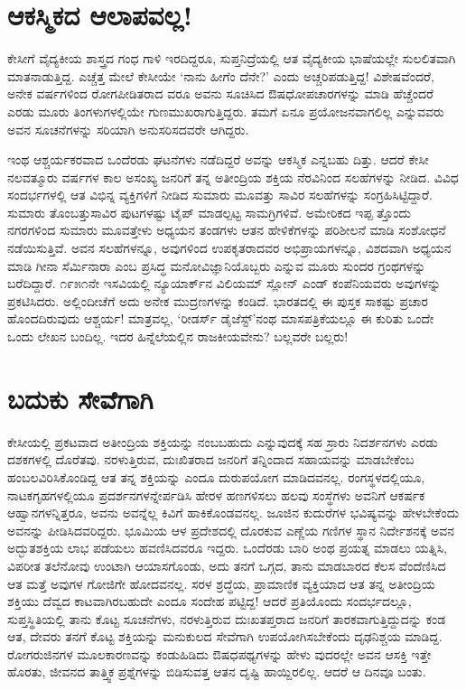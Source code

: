 \section{ಆಕಸ್ಮಿಕದ ಆಲಾಪವಲ್ಲ!}

ಕೇಸೀಗೆ ವೈದ್ಯಕೀಯ ಶಾಸ್ತ್ರದ ಗಂಧ ಗಾಳಿ ಇರದಿದ್ದರೂ, ಸುಪ್ತನಿದ್ರೆಯಲ್ಲಿ ಆತ ವೈದ್ಯಕೀಯ ಭಾಷೆಯಲ್ಲೇ ಸುಲಲಿತವಾಗಿ ಮಾತನಾಡುತ್ತಿದ್ದ. ಎಚ್ಚೆತ್ತ ಮೇಲೆ ಕೇಸೀಯೇ ‘ನಾನು ಹೀಗೆಂ ದೆನೇ?’ ಎಂದು ಅಚ್ಚರಿಪಡುತ್ತಿದ್ದ! ವಿಶೇಷವೆಂದರೆ, ಅನೇಕ ವರ್ಷಗಳಿಂದ ರೋಗಪೀಡಿತರಾದ ವರೂ ಅವನು ಸೂಚಿಸಿದ ಔಷಧೋಪಚಾರಗಳನ್ನು ಮಾಡಿ ಹೆಚ್ಚೆಂದರೆ ಎರಡು ಮೂರು ತಿಂಗಳುಗಳಲ್ಲಿಯೇ ಗುಣಮುಖರಾಗುತ್ತಿದ್ದರು. ತಮಗೆ ಏನೂ ಪ್ರಯೋಜನವಾಗಲಿಲ್ಲ ಎನ್ನುವವರು ಅವನ ಸೂಚನೆಗಳನ್ನು ಸರಿಯಾಗಿ ಅನುಸರಿಸದವರೇ ಆಗಿದ್ದರು.

ಇಂಥ ಆಶ್ಚರ್ಯಕರವಾದ ಒಂದೆರಡು ಘಟನೆಗಳು ನಡೆದಿದ್ದರೆ ಅವನ್ನು ಆಕಸ್ಮಿಕ ಎನ್ನಬಹು ದಿತ್ತು. ಆದರೆ ಕೇಸೀ ನಲವತ್ಮೂರು ವರ್ಷಗಳ ಕಾಲ ಅಸಂಖ್ಯ ಜನರಿಗೆ ತನ್ನ ಅತೀಂದ್ರಿಯ ಶಕ್ತಿಯ ನೆರವಿನಿಂದ ಸಲಹೆಗಳನ್ನು ನೀಡಿದ. ವಿವಿಧ ಸಂದರ್ಭಗಳಲ್ಲಿ ಆತ ವಿಭಿನ್ನ ವ್ಯಕ್ತಿಗಳಿಗೆ ನೀಡಿದ ಸುಮಾರು ಮೂವತ್ತು ಸಾವಿರ ಸಲಹೆಗಳನ್ನು ಸಂಗ್ರಹಿಸಿಟ್ಟಿದ್ದಾರೆ. ಸುಮಾರು ತೊಂಬತ್ತುಸಾವಿರ ಪುಟಗಳಷ್ಟು ಟೈಪ್ ಮಾಡಲ್ಪಟ್ಟ ಸಾಮಗ್ರಿಗಳಿವೆ. ಅಮೇರಿಕದ ಇಪ್ಪ ತ್ತೊಂದು ನಗರಗಳಿಂದ ಸುಮಾರು ಮೂವತ್ತೇಳು ಅಧ್ಯಯನ ತಂಡಗಳು ಆತನ ಹೇಳಿಕೆಗಳನ್ನು ಪರಿಶೀಲನೆ ಮಾಡಿ ಸಂಶೋಧನೆ ನಡೆಯಿಸುತ್ತಿವೆ. ಅವನ ಸಲಹೆಗಳನ್ನೂ, ಅವುಗಳಿಂದ ಉಪಕೃತರಾದವರ ಅಭಿಪ್ರಾಯಗಳನ್ನೂ, ವಿಶದವಾಗಿ ಅಧ್ಯಯನ ಮಾಡಿ ಗೀನಾ ಸೆರ್ಮಿನಾರಾ ಎಂಬ ಪ್ರಸಿದ್ಧ ಮನೋವಿಜ್ಞಾನಿಯೊಬ್ಬರು  ಎನ್ನುವ ಮೂರು ಸುಂದರ ಗ್ರಂಥಗಳನ್ನು ಬರೆದಿದ್ದಾರೆ. ೧೯೫೧ನೇ ಇಸವಿಯಲ್ಲಿ ನ್ಯೂಯಾರ್ಕ್​ನ ವಿಲಿಯಮ್ ಸ್ಲೋನ್ ಎಂಡ್ ಕಂಪೆನಿಯವರು ಅವುಗಳನ್ನು ಪ್ರಕಟಿಸಿದರು. ಅಲ್ಲಿಂದೀಚೆಗೆ ಅದು ಅನೇಕ ಮುದ್ರಣಗಳನ್ನು ಕಂಡಿದೆ. ಭಾರತದಲ್ಲಿ ಈ ಪುಸ್ತಕ ಸಾಕಷ್ಟು ಪ್ರಚಾರ ಹೊಂದದಿರುವುದು ಆಶ್ಚರ್ಯ! ಮಾತ್ರವಲ್ಲ, ‘ರೀಡರ್ಸ್ ಡೈಜೆಸ್ಟ್​’ನಂಥ ಮಾಸಪತ್ರಿಕೆಯಲ್ಲೂ ಈ ಕುರಿತು ಒಂದೇ ಒಂದು ಲೇಖನ ಬಂದಿಲ್ಲ. ಇದರ ಹಿನ್ನೆಲೆಯಲ್ಲಿನ ರಾಜಕೀಯವೇನು? ಬಲ್ಲವರೇ ಬಲ್ಲರು!


\section{ಬದುಕು ಸೇವೆಗಾಗಿ}

ಕೇಸೀಯಲ್ಲಿ ಪ್ರಕಟವಾದ ಅತೀಂದ್ರಿಯ ಶಕ್ತಿಯನ್ನು ನಂಬಬಹುದು ಎನ್ನುವುದಕ್ಕೆ ಸಹ ಸ್ರಾರು ನಿದರ್ಶನಗಳು ಎರಡು ದಶಕಗಳಲ್ಲಿ ದೊರೆತವು. ನರಳುತ್ತಿರುವ, ದುಃಖಿತರಾದ ಜನರಿಗೆ ತನ್ನಿಂದಾದ ಸಹಾಯವನ್ನು ಮಾಡಬೇಕೆಂಬ ಹಂಬಲವಿರಿಸಿಕೊಂಡಿದ್ದ ಆತ ತನ್ನ ಶಕ್ತಿಯನ್ನು ಎಂದೂ ದುರುಪಯೋಗ ಮಾಡಿದವನಲ್ಲ. ರಂಗಸ್ಥಳದಲ್ಲಿಯೂ, ನಾಟಕಗೃಹಗಳಲ್ಲಿಯೂ ಪ್ರದರ್ಶನಗಳನ್ನೇರ್ಪಡಿಸಿ ಹೇರಳ ಹಣಗಳಿಸಲು ಹಲವು ಸಂಸ್ಥೆಗಳು ಅವನಿಗೆ ಆಕರ್ಷಕ ಆಹ್ವಾನಗಳನ್ನಿತ್ತರೂ, ಅವನು ಅವನ್ನೆಲ್ಲ ಕಿವಿಗೆ ಹಾಕಿಕೊಂಡವನಲ್ಲ. ಜೂಜಿನ ಕುದುರೆಗಳ ಭವಿಷ್ಯವನ್ನು ಹೇಳಬೇಕೆಂದು ಅವನನ್ನು ಪೀಡಿಸಿದವರಿದ್ದರು. ಭೂಮಿಯ ಆಳ ಪ್ರದೇಶದಲ್ಲಿ ದೊರಕುವ ಎಣ್ಣೆಯ ಗಣಿಗಳ ಸ್ಥಾನ ನಿರ್ದೇಶನಕ್ಕೆ ಅವನ ಅದ್ಭುತಶಕ್ತಿಯ ಲಾಭ ಪಡೆಯಲು ಹವಣಿಸಿದವರೂ ಇದ್ದರು. ಒಂದೆರಡು ಬಾರಿ ಅಂಥ ಪ್ರಯತ್ನ ಮಾಡಲು ಯತ್ನಿಸಿ, ವಿಪರೀತ ತಲೆನೋವು ಉಂಟಾಗಿ ಆಯಾಸಗೊಂಡು, ಅದು ತನಗೆ ಒಗ್ಗದ, ತಾನು ಮಾಡಬಾರದ ಕೆಲಸ ವೆಂದೆಣಿಸಿದ ಆತ ಮತ್ತೆ ಅವುಗಳ ಗೋಜಿಗೇ ಹೋದವನಲ್ಲ. ಸರಳ ಶ್ರದ್ಧೆಯ, ಪ್ರಾಮಾಣಿಕ ವ್ಯಕ್ತಿಯಾದ ಆತ ತನ್ನ ಅತೀಂದ್ರಿಯ ಶಕ್ತಿಯು ದೆವ್ವದ ಕಾಟವಾಗಿರಬಹುದೇ ಎಂದೂ ಸಂದೇಹ ಪಟ್ಟಿದ್ದ! ಆದರೆ ಪ್ರತಿಯೊಂದು ಸಂದರ್ಭದಲ್ಲೂ, ಸುಪ್ತಸ್ಥಿತಿಯಲ್ಲಿ ತಾನು ಕೊಟ್ಟ ಸೂಚನೆಗಳು, ನರಳುತ್ತಿರುವ ದುಃಖತಪ್ತರಾದ ಜನರಿಗೆ ತಾರಕವಾಗುತ್ತಿದ್ದುದನ್ನು ಕಂಡ ಆತ, ದೇವರು ತನಗೆ ಕೊಟ್ಟ ಶಕ್ತಿಯನ್ನು ಮನುಕುಲದ ಸೇವೆಗಾಗಿ ಉಪಯೋಗಿಸಬೇಕೆಂದು ದೃಢನಿಶ್ಚಯ ಮಾಡಿದ್ದ. ರೋಗರುಜಿನಗಳ ಮೂಲಕಾರಣವನ್ನು ಕಂಡುಹಿಡಿದು ಔಷಧಪಥ್ಯಗಳನ್ನು ಹೇಳು ವುದರಲ್ಲೇ ಅವನ ಆಸಕ್ತಿ ಇತ್ತೇ ಹೊರತು, ಜೀವನದ ತಾತ್ತ್ವಿಕ ಪ್ರಶ್ನೆಗಳನ್ನು ಬಿಡಿಸುವತ್ತ ಆತನ ದೃಷ್ಟಿ ಹಾಯ್ದಿರಲಿಲ್ಲ. ಆದರೆ ಆ ದಿನವೂ ಬಂತು.


